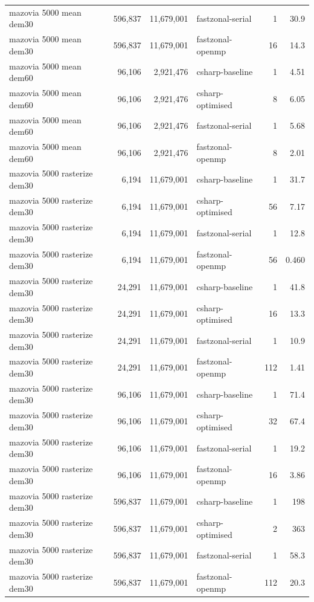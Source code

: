 \begin{tabular}{lrrlrr}
mazovia 5000 mean dem30 & 596,837 & 11,679,001 & fastzonal-serial & 1 & 30.9 \\
mazovia 5000 mean dem30 & 596,837 & 11,679,001 & fastzonal-openmp & 16 & 14.3 \\
mazovia 5000 mean dem60 & 96,106 & 2,921,476 & csharp-baseline & 1 & 4.51 \\
mazovia 5000 mean dem60 & 96,106 & 2,921,476 & csharp-optimised & 8 & 6.05 \\
mazovia 5000 mean dem60 & 96,106 & 2,921,476 & fastzonal-serial & 1 & 5.68 \\
mazovia 5000 mean dem60 & 96,106 & 2,921,476 & fastzonal-openmp & 8 & 2.01 \\
mazovia 5000 rasterize dem30 & 6,194 & 11,679,001 & csharp-baseline & 1 & 31.7 \\
mazovia 5000 rasterize dem30 & 6,194 & 11,679,001 & csharp-optimised & 56 & 7.17 \\
mazovia 5000 rasterize dem30 & 6,194 & 11,679,001 & fastzonal-serial & 1 & 12.8 \\
mazovia 5000 rasterize dem30 & 6,194 & 11,679,001 & fastzonal-openmp & 56 & 0.460 \\
mazovia 5000 rasterize dem30 & 24,291 & 11,679,001 & csharp-baseline & 1 & 41.8 \\
mazovia 5000 rasterize dem30 & 24,291 & 11,679,001 & csharp-optimised & 16 & 13.3 \\
mazovia 5000 rasterize dem30 & 24,291 & 11,679,001 & fastzonal-serial & 1 & 10.9 \\
mazovia 5000 rasterize dem30 & 24,291 & 11,679,001 & fastzonal-openmp & 112 & 1.41 \\
mazovia 5000 rasterize dem30 & 96,106 & 11,679,001 & csharp-baseline & 1 & 71.4 \\
mazovia 5000 rasterize dem30 & 96,106 & 11,679,001 & csharp-optimised & 32 & 67.4 \\
mazovia 5000 rasterize dem30 & 96,106 & 11,679,001 & fastzonal-serial & 1 & 19.2 \\
mazovia 5000 rasterize dem30 & 96,106 & 11,679,001 & fastzonal-openmp & 16 & 3.86 \\
mazovia 5000 rasterize dem30 & 596,837 & 11,679,001 & csharp-baseline & 1 & 198 \\
mazovia 5000 rasterize dem30 & 596,837 & 11,679,001 & csharp-optimised & 2 & 363 \\
mazovia 5000 rasterize dem30 & 596,837 & 11,679,001 & fastzonal-serial & 1 & 58.3 \\
mazovia 5000 rasterize dem30 & 596,837 & 11,679,001 & fastzonal-openmp & 112 & 20.3 \\

\end{tabular}
